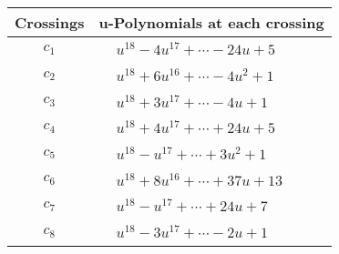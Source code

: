 \documentclass[1p]{elsarticle_modified}
\theoremstyle{definition}
\begin{document}
\begin{tabular}{m{50pt}|m{274pt}}
Crossings & \hspace{64pt}u-Polynomials at each crossing \\
\hline $$\begin{aligned}c_{1}\end{aligned}$$&$\begin{aligned}
&u^{18}-4 u^{17}+\cdots-24 u+5
\end{aligned}$\\
\hline $$\begin{aligned}c_{2}\end{aligned}$$&$\begin{aligned}
&u^{18}+6 u^{16}+\cdots-4 u^2+1
\end{aligned}$\\
\hline $$\begin{aligned}c_{3}\end{aligned}$$&$\begin{aligned}
&u^{18}+3 u^{17}+\cdots-4 u+1
\end{aligned}$\\
\hline $$\begin{aligned}c_{4}\end{aligned}$$&$\begin{aligned}
&u^{18}+4 u^{17}+\cdots+24 u+5
\end{aligned}$\\
\hline $$\begin{aligned}c_{5}\end{aligned}$$&$\begin{aligned}
&u^{18}- u^{17}+\cdots+3 u^2+1
\end{aligned}$\\
\hline $$\begin{aligned}c_{6}\end{aligned}$$&$\begin{aligned}
&u^{18}+8 u^{16}+\cdots+37 u+13
\end{aligned}$\\
\hline $$\begin{aligned}c_{7}\end{aligned}$$&$\begin{aligned}
&u^{18}- u^{17}+\cdots+24 u+7
\end{aligned}$\\
\hline $$\begin{aligned}c_{8}\end{aligned}$$&$\begin{aligned}
&u^{18}-3 u^{17}+\cdots-2 u+1
\end{aligned}$\\

\end{tabular}
\end{document}
